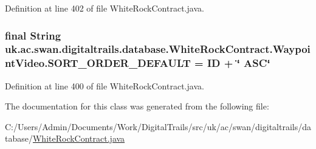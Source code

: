 Definition at line 402 of file White\+Rock\+Contract.\+java.

\hypertarget{classuk_1_1ac_1_1swan_1_1digitaltrails_1_1database_1_1_white_rock_contract_1_1_waypoint_video_abb272973966cf7ebf8b6eb675e3162cb}{
\subsubsection[{S\+O\+R\+T\+\_\+\+O\+R\+D\+E\+R\+\_\+\+D\+E\+F\+A\+U\+L\+T}]{\setlength{\rightskip}{0pt plus 5cm}final String uk.\+ac.\+swan.\+digitaltrails.\+database.\+White\+Rock\+Contract.\+Waypoint\+Video.\+S\+O\+R\+T\+\_\+\+O\+R\+D\+E\+R\+\_\+\+D\+E\+F\+A\+U\+L\+T = I\+D + \char`\"{} A\+S\+C\char`\"{}\hspace{0.3cm}{\ttfamily [static]}}}\label{classuk_1_1ac_1_1swan_1_1digitaltrails_1_1database_1_1_white_rock_contract_1_1_waypoint_video_abb272973966cf7ebf8b6eb675e3162cb}


Definition at line 400 of file White\+Rock\+Contract.\+java.



The documentation for this class was generated from the following file\+:\begin{DoxyCompactItemize}
\item 
C\+:/\+Users/\+Admin/\+Documents/\+Work/\+Digital\+Trails/src/uk/ac/swan/digitaltrails/database/\hyperlink{_white_rock_contract_8java}{White\+Rock\+Contract.\+java}\end{DoxyCompactItemize}
